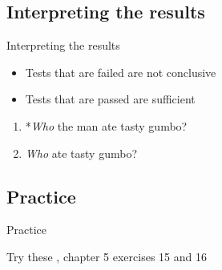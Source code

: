 \documentclass{beamer}
\newcommand{\subonefive}{Interpreting the results}
\newcommand{\subonesix}{Practice}
\begin{document}
    \subsection{\subonefive}
      \begin{frame}{\subonefive}
        \begin{block}{}
          \begin{itemize}
            \item Tests that are failed are not conclusive
            \item Tests that are passed are sufficient
          \end{itemize}
        \end{block}
        \begin{example}
          \begin{enumerate}
            \item *\emph{Who} the man ate tasty gumbo?
            \item<2-> \emph{Who} ate tasty gumbo?
          \end{enumerate}
        \end{example}
      \end{frame}

    \subsection{\subonesix}
      \begin{frame}{\subonesix}
        \begin{block}{Try these}
          \textcite{dawson_language_2016}, chapter 5 exercises 15 and 16
        \end{block}
      \end{frame}
\end{document}
